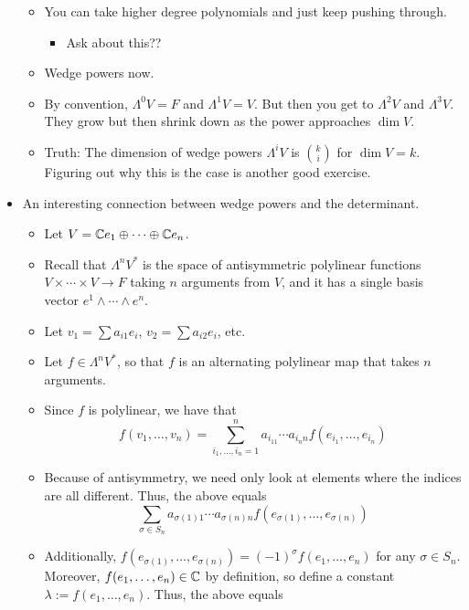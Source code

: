 \documentclass[../notes.tex]{subfiles}
\begin{document}
\begin{itemize}
\begin{itemize}
        \item You can take higher degree polynomials and just keep pushing through.
        \begin{itemize}
            \item Ask about this??
        \end{itemize}
        \item Wedge powers now.
        \item By convention, $\Lambda^0V=F$ and $\Lambda^1V=V$. But then you get to $\Lambda^2V$ and $\Lambda^3V$. They grow but then shrink down as the power approaches $\dim V$.
        \item Truth: The dimension of wedge powers $\Lambda^iV$ is $\binom{k}{i}$ for $\dim V=k$. Figuring out why this is the case is another good exercise.
    \end{itemize}
    \item An interesting connection between wedge powers and the determinant.
    \begin{itemize}
        \item Let $V=\mathbb{C} e_1\oplus\cdots\oplus\mathbb{C} e_n$.
        \item Recall that $\Lambda^nV^*$ is the space of antisymmetric polylinear functions $V\times\cdots\times V\to F$ taking $n$ arguments from $V$, and it has a single basis vector $e^1\wedge\cdots\wedge e^n$.
        \item Let $v_1=\sum a_{i1}e_i$, $v_2=\sum a_{i2}e_i$, etc.
        \item Let $f\in\Lambda^nV^*$, so that $f$ is an alternating polylinear map that takes $n$ arguments.
        \item Since $f$ is polylinear, we have that
        \begin{equation*}
            f(v_1,\dots,v_n) = \sum_{i_1,\dots,i_n=1}^na_{i_11}\cdots a_{i_nn}f(e_{i_1},\dots,e_{i_n})
        \end{equation*}
        \item Because of antisymmetry, we need only look at elements where the indices are all different. Thus, the above equals
        \begin{equation*}
            \sum_{\sigma\in S_n}a_{\sigma(1)1}\cdots a_{\sigma(n)n}f(e_{\sigma(1)},\dots,e_{\sigma(n)})
        \end{equation*}
        \item Additionally, $f(e_{\sigma(1)},\dots,e_{\sigma(n)})=(-1)^\sigma f(e_1,\dots,e_n)$ for any $\sigma\in S_n$. Moreover, $f(e_1,\dots,e_n)\in\mathbb{C}$ by definition, so define a constant $\lambda:=f(e_1,\dots,e_n)$. Thus, the above equals

\end{itemize}
\end{itemize}
\end{document}
